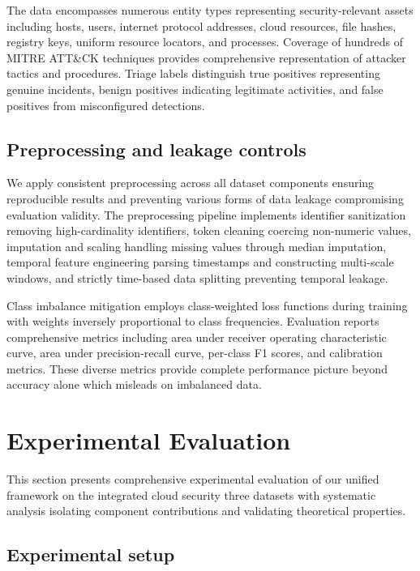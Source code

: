 \documentclass[10pt,journal,compsoc]{IEEEtran}
\begin{document}
The data encompasses numerous entity types representing security-relevant assets including hosts, users, internet protocol addresses, cloud resources, file hashes, registry keys, uniform resource locators, and processes. Coverage of hundreds of MITRE ATT\&CK techniques provides comprehensive representation of attacker tactics and procedures. Triage labels distinguish true positives representing genuine incidents, benign positives indicating legitimate activities, and false positives from misconfigured detections.

\subsection{Preprocessing and leakage controls}

We apply consistent preprocessing across all dataset components ensuring reproducible results and preventing various forms of data leakage compromising evaluation validity. The preprocessing pipeline implements identifier sanitization removing high-cardinality identifiers, token cleaning coercing non-numeric values, imputation and scaling handling missing values through median imputation, temporal feature engineering parsing timestamps and constructing multi-scale windows, and strictly time-based data splitting preventing temporal leakage.

Class imbalance mitigation employs class-weighted loss functions during training with weights inversely proportional to class frequencies. Evaluation reports comprehensive metrics including area under receiver operating characteristic curve, area under precision-recall curve, per-class F1 scores, and calibration metrics. These diverse metrics provide complete performance picture beyond accuracy alone which misleads on imbalanced data.

\section{Experimental Evaluation}
\label{sec:experiments}

This section presents comprehensive experimental evaluation of our unified framework on the integrated cloud security three datasets with systematic analysis isolating component contributions and validating theoretical properties.

\subsection{Experimental setup}
\end{document}
